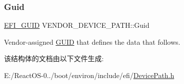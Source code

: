 \subsubsection{\texorpdfstring{Guid}{Guid}}
{\footnotesize\ttfamily \hyperlink{_uefi_base_type_8h_ad87614428813f71edb2c2d802e9ce2af}{E\+F\+I\+\_\+\+G\+U\+ID} V\+E\+N\+D\+O\+R\+\_\+\+D\+E\+V\+I\+C\+E\+\_\+\+P\+A\+T\+H\+::\+Guid}

Vendor-\/assigned \hyperlink{interface_g_u_i_d}{G\+U\+ID} that defines the data that follows. 

该结构体的文档由以下文件生成\+:\begin{DoxyCompactItemize}
\item 
E\+:/\+React\+O\+S-\/0../boot/environ/include/efi/\hyperlink{_device_path_8h}{Device\+Path.\+h}\end{DoxyCompactItemize}
